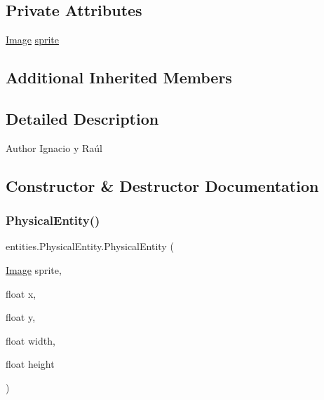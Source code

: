 \subsection*{Private Attributes}
\begin{DoxyCompactItemize}
\item 
\mbox{\hyperlink{classorg_1_1newdawn_1_1slick_1_1_image}{Image}} \mbox{\hyperlink{classentities_1_1_physical_entity_aeb439b2308ab19fb6d3ff6be6f7cdbd8}{sprite}}
\end{DoxyCompactItemize}
\subsection*{Additional Inherited Members}


\subsection{Detailed Description}
\begin{DoxyAuthor}{Author}
Ignacio y Raúl 
\end{DoxyAuthor}


\subsection{Constructor \& Destructor Documentation}
\mbox{\label{classentities_1_1_physical_entity_a1c391ef73853151741549826ce603409}} 
\subsubsection{\texorpdfstring{Physical\+Entity()}{PhysicalEntity()}}
{\footnotesize\ttfamily entities.\+Physical\+Entity.\+Physical\+Entity (\begin{DoxyParamCaption}\item[{\mbox{\hyperlink{classorg_1_1newdawn_1_1slick_1_1_image}{Image}}}]{sprite,  }\item[{float}]{x,  }\item[{float}]{y,  }\item[{float}]{width,  }\item[{float}]{height }\end{DoxyParamCaption})\hspace{0.3cm}{\ttfamily [inline]}}


